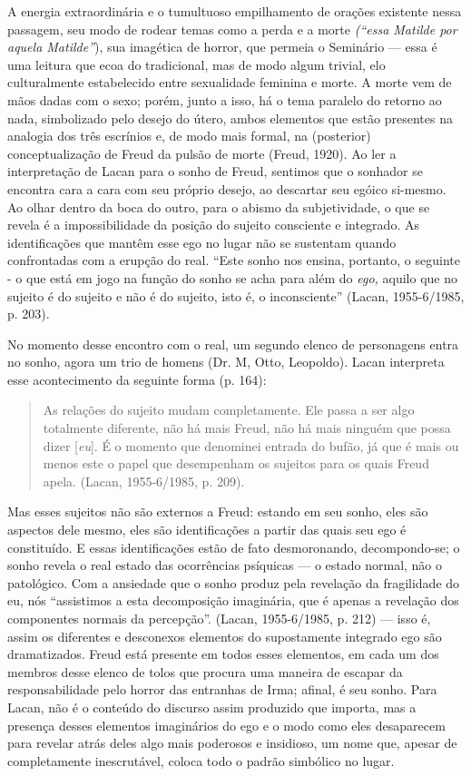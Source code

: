 A energia extraordinária e o tumultuoso empilhamento de orações
existente nessa passagem, seu modo de rodear temas como a perda e a
morte \emph{(``essa Matilde por aquela Matilde''}), sua imagética de
horror, que permeia o Seminário --- essa é uma leitura que ecoa do
tradicional, mas de modo algum trivial, elo culturalmente estabelecido
entre sexualidade feminina e morte. A morte vem de mãos dadas com o
sexo; porém, junto a isso, há o tema paralelo do retorno ao nada,
simbolizado pelo desejo do útero, ambos elementos que estão presentes na
analogia dos três escrínios e, de modo mais formal, na (posterior)
conceptualização de Freud da pulsão de morte (Freud, 1920). Ao ler a
interpretação de Lacan para o sonho de Freud, sentimos que o sonhador se
encontra cara a cara com seu próprio desejo, ao descartar seu egóico
si-mesmo. Ao olhar dentro da boca do outro, para o abismo da
subjetividade, o que se revela é a impossibilidade da posição do sujeito
consciente e integrado. As identificações que mantêm esse ego no lugar
não se sustentam quando confrontadas com a erupção do real. ``Este sonho
nos ensina, portanto, o seguinte - o que está em jogo na função do sonho
se acha para além do \emph{ego,} aquilo que no sujeito é do sujeito e
não é do sujeito, isto é, o inconsciente'' (Lacan, 1955-6/1985, p. 203).

No momento desse encontro com o real, um segundo elenco de personagens
entra no sonho, agora um trio de homens (Dr. M, Otto, Leopoldo). Lacan
interpreta esse acontecimento da seguinte forma (p. 164):

\begin{quote}
As relações do sujeito mudam completamente. Ele passa a ser algo
totalmente diferente, não há mais Freud, não há mais ninguém que possa
dizer {[}\emph{eu}{]}. É o momento que denominei entrada do bufão, já
que é mais ou menos este o papel que desempenham os sujeitos para os
quais Freud apela. (Lacan, 1955-6/1985, p. 209).
\end{quote}

Mas esses sujeitos não são externos a Freud: estando em seu sonho, eles
são aspectos dele mesmo, eles são identificações a partir das quais seu
ego é constituído. E essas identificações estão de fato desmoronando,
decompondo-se; o sonho revela o real estado das ocorrências psíquicas ---
o estado normal, não o patológico. Com a ansiedade que o sonho produz
pela revelação da fragilidade do eu, nós ``assistimos a esta
decomposição imaginária, que é apenas a revelação dos componentes
normais da percepção''. (Lacan, 1955-6/1985, p. 212) --- isso é, assim os
diferentes e desconexos elementos do supostamente integrado ego são
dramatizados. Freud está presente em todos esses elementos, em cada um
dos membros desse elenco de tolos que procura uma maneira de escapar da
responsabilidade pelo horror das entranhas de Irma; afinal, é seu sonho.
Para Lacan, não é o conteúdo do discurso assim produzido que importa,
mas a presença desses elementos imaginários do ego e o modo como eles
desaparecem para revelar atrás deles algo mais poderosos e insidioso, um
nome que, apesar de completamente inescrutável, coloca todo o padrão
simbólico no lugar.

